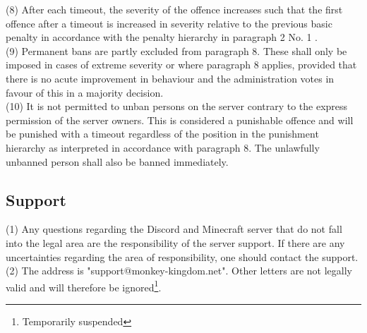 \documentclass{article}
\begin{document}
(8) After each timeout, the severity of the offence increases such that the first offence after a timeout is increased in severity relative to the previous basic penalty in accordance with the penalty hierarchy in paragraph 2 No. 1 .\\
(9) Permanent bans are partly excluded from paragraph 8. These shall only be imposed in cases of extreme severity or where paragraph 8 applies, provided that there is no acute improvement in behaviour and the administration votes in favour of this in a majority decision.\\
(10) It is not permitted to unban persons on the server contrary to the express permission of the server owners. This is considered a punishable offence and will be punished with a timeout regardless of the position in the punishment hierarchy as interpreted in accordance with paragraph 8. The unlawfully unbanned person shall also be banned immediately.

\subsection{Support}\label{support}
(1) Any questions regarding the Discord and Minecraft server that do not fall into the legal area are the responsibility of the server support. If there are any uncertainties regarding the area of responsibility, one should contact the support.\\
(2) The address is "support@monkey-kingdom.net". Other letters are not legally valid and will therefore be ignored\footnote{Temporarily suspended}.\\
\end{document}
